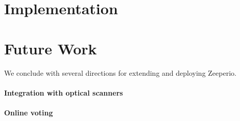 \documentclass{llncs}
\begin{document}
\section{Implementation}

\section{Future Work}

We conclude with several directions for extending and deploying Zeeperio.

\paragraph{Integration with optical scanners}

\paragraph{Online voting}
\end{document}
